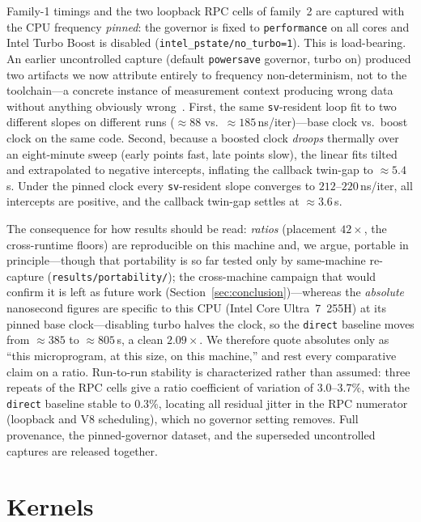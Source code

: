 \documentclass[conference]{IEEEtran}
\newcommand{\code}[1]{\texttt{#1}}
\begin{document}
Family-1 timings and the two loopback RPC cells of family~2 are captured with the
CPU frequency \emph{pinned}: the governor is fixed to \code{performance} on all
cores and Intel Turbo Boost is disabled (\code{intel\_pstate/no\_turbo=1}). This
is load-bearing. An earlier uncontrolled capture (default \code{powersave}
governor, turbo on) produced two artifacts we now attribute entirely to
frequency non-determinism, not to the toolchain---a concrete instance of
measurement context producing wrong data without anything obviously
wrong~\cite{mytkowicz}. First, the same \code{sv}-resident
loop fit to two different slopes on different runs ($\approx$$88$ vs.\
$\approx$$185$\,ns/iter)---base clock vs.\ boost clock on the same code. Second,
because a boosted clock \emph{droops} thermally over an eight-minute sweep (early
points fast, late points slow), the linear fits tilted and extrapolated to
negative intercepts, inflating the callback twin-gap to $\approx$$5.4$\,\textmu s.
Under the pinned clock every \code{sv}-resident slope converges to
$212$--$220$\,ns/iter, all intercepts are positive, and the callback twin-gap
settles at $\approx$$3.6$\,\textmu s.

The consequence for how results should be read: \emph{ratios} (placement
$42\times$, the cross-runtime floors) are reproducible on this machine and, we
argue, portable in principle---though that portability is so far tested only by
same-machine re-capture (\code{results/portability/}); the cross-machine
campaign that would confirm it is left as future work (Section~\ref{sec:conclusion})---whereas the
\emph{absolute} nanosecond figures are specific to this CPU
(Intel Core Ultra~7~255H) at its pinned base clock---disabling turbo halves the
clock, so the \code{direct} baseline moves from $\approx$$385$ to
$\approx$$805$\,\textmu s, a clean $2.09\times$. We therefore quote absolutes only
as ``this microprogram, at this size, on this machine,'' and rest every
comparative claim on a ratio. Run-to-run stability is characterized rather than
assumed: three repeats of the RPC cells give a ratio coefficient of variation of
$3.0$--$3.7\%$, with the \code{direct} baseline stable to $0.3\%$, locating all
residual jitter in the RPC numerator (loopback and V8 scheduling), which no
governor setting removes. Full provenance, the pinned-governor dataset, and the
superseded uncontrolled captures are released together.

\section{Kernels}
\label{sec:kernels}
\end{document}
